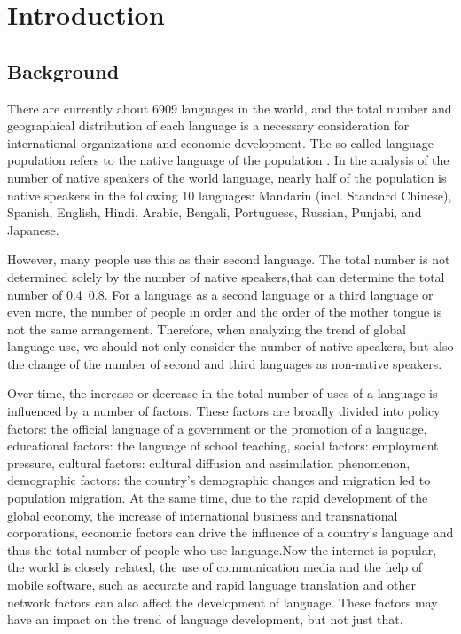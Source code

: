 \section{Introduction}
\subsection{Background}
\noindent
There are currently about 6909 languages in the world, and the total number and geographical distribution of each language is a necessary consideration for international organizations and economic development. The so-called language population refers to the native language of the population . In the analysis of the number of native speakers of the world language, nearly half of the population is native speakers in the following 10 languages: Mandarin (incl. Standard Chinese), Spanish, English, Hindi, Arabic, Bengali, Portuguese, Russian, Punjabi, and Japanese.

However, many people use this as their second language. The total number is not determined solely by the number of native speakers,that can determine the total number of 0.4~0.8. For a language as a second language or a third language or even more, the number of people in order and the order of the mother tongue is not the same arrangement. Therefore, when analyzing the trend of global language use, we should not only consider the number of native speakers, but also the change of the number of  second and third languages as non-native speakers. 

Over time, the increase or decrease in the total number of uses of a language is influenced by a number of factors. These factors are broadly divided into policy factors: the official language of a government or the promotion of a language, educational factors: the language of school teaching, social factors: employment pressure, cultural factors: cultural diffusion and assimilation phenomenon, demographic factors: the country's demographic changes and migration led to population migration. At the same time, due to the rapid development of the global economy, the increase of international business and transnational corporations, economic factors can drive the influence of a country's language and thus the total number of people who use language.Now the internet is popular, the world is closely related, the use of communication media and the help of mobile software, such as accurate and rapid language translation and other network factors can also affect the development of language. These factors may have an impact on the trend of language development, but not just that. 
